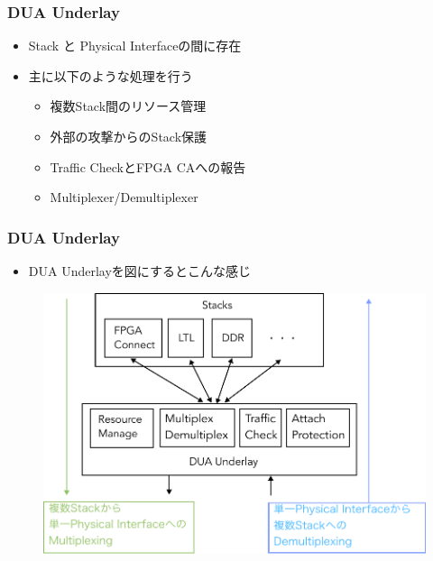 \documentclass[dvipdfmx,9pt,notheorems]{beamer}
\theoremstyle{definition}
\begin{document}
\begin{frame}\frametitle{DUA Underlay}
	\begin{itemize}
		\item Stack と Physical Interfaceの間に存在
		\item 主に以下のような処理を行う
			\begin{itemize}
				\item 複数Stack間のリソース管理       %
				\item 外部の攻撃からのStack保護       %
				\item Traffic CheckとFPGA CAへの報告  %
				\item Multiplexer/Demultiplexer       %
			\end{itemize}
	\end{itemize}
\pnote{
}
\end{frame}

\begin{frame}\frametitle{DUA Underlay}
	\begin{itemize}
		\item DUA Underlayを図にするとこんな感じ
		\end{itemize}
  \begin{figure}[htb]
		\includegraphics[scale=0.5]{fig/ez_FPGA_Underlay.pdf}
  \end{figure}
\pnote{
}
\end{frame}
\end{document}
